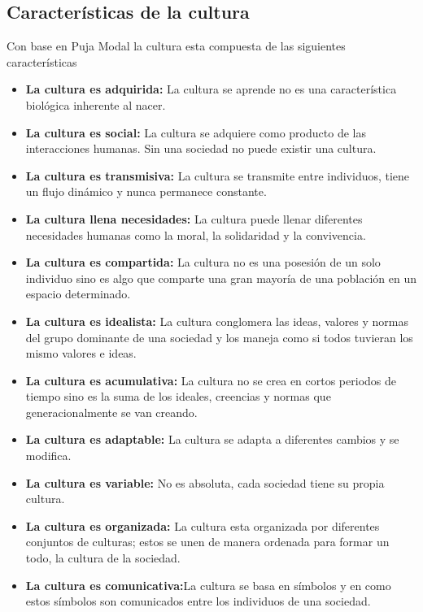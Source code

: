         \subsection{Características de la cultura}\label{CulturaCaract}
        Con base en Puja Modal la cultura esta compuesta de las siguientes 
        características\cite{RefculturaCarac}
        \begin{itemize}
                \item \textbf{La cultura es adquirida:} La cultura se aprende no es una 
                característica biológica inherente al nacer. 
                \item \textbf{La cultura es social:} La cultura se adquiere como 
                producto de las interacciones humanas. Sin una sociedad no puede 
                existir una cultura.
                \item \textbf{La cultura es transmisiva:} La cultura se transmite 
                entre individuos, tiene un flujo dinámico y nunca permanece constante.
                \item \textbf{La cultura llena necesidades:} La cultura puede 
                llenar diferentes necesidades humanas como la moral, la solidaridad 
                y la convivencia.
                \item \textbf{La cultura es compartida:} La cultura no es una 
                posesión de un solo individuo sino es algo que comparte una gran 
                mayoría de una población en un espacio determinado.
                \item \textbf{La cultura es idealista:} La cultura conglomera las 
                ideas, valores y normas del grupo dominante de una sociedad y los 
                maneja como si todos tuvieran los mismo valores e ideas. 
                \item \textbf{La cultura es acumulativa:} La cultura no se crea 
                en cortos periodos de tiempo sino es la suma de los ideales, 
                creencias y normas que generacionalmente se van creando.
                \item \textbf{La cultura es adaptable:} La cultura se adapta a 
                diferentes cambios y se modifica.
                \item \textbf{La cultura es variable:} No es absoluta, cada sociedad 
                tiene su propia cultura.
                \item \textbf{La cultura es organizada:} La cultura esta 
                organizada por diferentes conjuntos de culturas; estos se unen 
                de manera ordenada para formar un todo, la cultura de la sociedad. 
                \item \textbf{La cultura es comunicativa:}La cultura se basa en 
                símbolos y en como estos símbolos son comunicados entre los individuos 
                de una sociedad. 
        \end{itemize}
        

